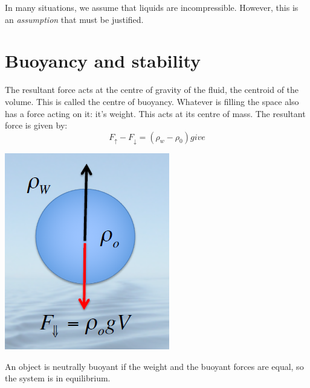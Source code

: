 \documentclass[class=report, crop=false, 12pt,a4paper]{standalone}
\begin{document}
In many situations, we assume  that liquids are incompressible. However, this is an \emph{assumption} that must be justified. 

\section{Buoyancy and stability}
The resultant force acts at the centre of gravity of the fluid, the centroid of the volume. This is called the centre of buoyancy. Whatever is filling the space also has a force acting on it: it's weight. This acts at its centre of mass. The resultant force is given by: 
\begin{equation}
  F_\uparrow - F_\downarrow = (\rho_w - \rho_0) give
\end{equation}
\begin{center}
  \includegraphics[width = 0.4 \textwidth]{../img/BuoyancyForces}
\end{center}
An object is neutrally buoyant if the weight and the buoyant forces are equal, so the system is in equilibrium. 
\end{document}
